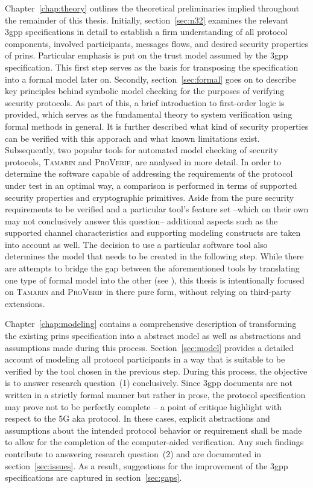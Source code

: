 Chapter~\ref{chap:theory} outlines the theoretical preliminaries implied throughout the remainder of this thesis.
Initially, section~\ref{sec:n32} examines the relevant \gls{3gpp} specifications in detail to establish a firm understanding of all protocol components, involved participants, messages flows, and desired security properties of \gls{prins}.
Particular emphasis is put on the trust model assumed by the \gls{3gpp} specification.
This first step serves as the basis for transposing the specification into a formal model later on.
Secondly, section~\ref{sec:formal} goes on to describe key principles behind symbolic model checking for the purposes of verifying security protocols.
As part of this, a brief introduction to first-order logic is provided, which serves as the fundamental theory to system verification using formal methods in general.
It is further described what kind of security properties can be verified with this apporach and what known limitations exist.
Subsequently, two popular tools for automated model checking of security protocols, \textsc{Tamarin} and \textsc{ProVerif}, are analysed in more detail.
In order to determine the software capable of addressing the requirements of the protocol under test in an optimal way, a comparison is performed in terms of supported security properties and cryptographic primitives.
Aside from the pure security requirements to be verified and a particular tool's feature set --which on their own may not conclusively answer this question-- additional aspects such as the supported channel characteristics and supporting modeling constructs are taken into account as well.
The decision to use a particular software tool also determines the model that needs to be created in the following step.
While there are attempts to bridge the gap between the aforementioned tools by translating one type of formal model into the other (see \cite{kremer2016automated}), this thesis is intentionally focused on \textsc{Tamarin} and \textsc{ProVerif} in there pure form, without relying on third-party extensions.

Chapter~\ref{chap:modeling} contains a comprehensive description of transforming the existing \gls{prins} specification into a abstract model as well as abstractions and assumptions made during this process.
Section~\ref{sec:model} provides a detailed account of modeling all protocol participants in a way that is suitable to be verified by the tool chosen in the previous step.
During this process, the objective is to answer research question~(1) conclusively.
Since \gls{3gpp} documents are not written in a strictly formal manner but rather in prose, the protocol specification may prove not to be perfectly complete -- a point of critique \cite{basin2018model} highlight with respect to the 5G \gls{aka} protocol.
In these cases, explicit abstractions and assumptions about the intended protocol behavior or requirement shall be made to allow for the completion of the computer-aided verification.
Any such findings contribute to answering research question~(2) and are documented in section~\ref{sec:issues}.
As a result, suggestions for the improvement of the \gls{3gpp} specifications are captured in section~\ref{sec:gaps}.

